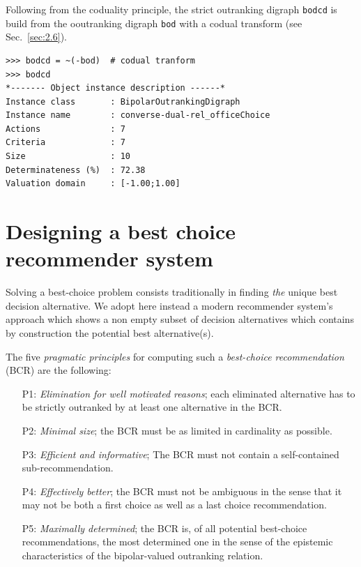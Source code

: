 Following from the coduality principle, the strict outranking digraph \texttt{bodcd} is build from the ooutranking digraph \texttt{bod} with a codual transform (see Sec.~\ref{sec:2.6}).
\begin{lstlisting} 
>>> bodcd = ~(-bod)  # codual tranform
>>> bodcd
*------- Object instance description ------*
Instance class       : BipolarOutrankingDigraph
Instance name        : converse-dual-rel_officeChoice
Actions              : 7
Criteria             : 7
Size                 : 10
Determinateness (%)  : 72.38
Valuation domain     : [-1.00;1.00]
\end{lstlisting}


\section{Designing a best choice recommender system}
\label{sec:4.4}

Solving a best-choice problem consists traditionally in finding \emph{the} unique best decision alternative. We adopt here instead a modern recommender system’s approach which shows a non empty subset of decision alternatives which contains by construction the potential best alternative(s).

The five \emph{pragmatic principles} for computing such a \emph{best-choice recommendation} (BCR) are the following:
\begin{itemize}[leftmargin=1cm,listparindent=0em]
\item [P1:] \emph{Elimination for well motivated reasons}; each eliminated alternative has to be strictly outranked by at least one alternative in the BCR.
\item [P2:] \emph{Minimal size}; the BCR must be as limited in cardinality as possible.
\item [P3:] \emph{Efficient and informative}; The BCR must not contain a self-contained sub-recommendation.
\item [P4:] \emph{Effectively better}; the BCR must not be ambiguous in the sense that it may not be both a first choice as well as a last choice recommendation.
\item [P5:] \emph{Maximally determined}; the BCR is, of all potential best-choice recommendations, the most determined one in the sense of the epistemic characteristics of the bipolar-valued outranking relation.
\end{itemize}

